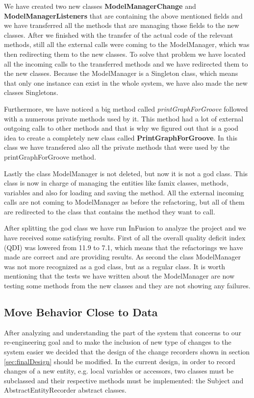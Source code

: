 \documentclass[a4paper]{article}
\begin{document}
We have created two new classes \textbf{ModelManagerChange} and \textbf{ModelManagerListeners} that are containing the above mentioned fields and we have transferred all the methods that are managing those fields to the new classes. After we finished with the transfer of the actual code of the relevant methods, still all the external calls were coming to the ModelManager, which was then redirecting them to the new classes. To solve that problem we have located all the incoming calls to the transferred methods and we have redirected them to the new classes. Because the ModelManager is a Singleton class, which means that only one instance can exist in the whole system, we have also made the new classes Singletons.

Furthermore, we have noticed a big method called \emph{printGraphForGroove} followed with a numerous private methods used by it. This method had a lot of external outgoing calls to other methods and that is why we figured out that is a good idea to create a completely new class called \textbf{PrintGraphForGroove}. In this class we have transfered also all the private methods that were used by the printGraphForGroove method.

Lastly the class ModelManager is not deleted, but now it is not a god class. This class is now in charge of managing the entities like famix classes, methods, variables and also for loading and saving the method. All the external incoming calls are not coming to ModelManager as before the refactoring, but all of them are redirected to the class that contains the method they want to call.

After splitting the god class we have run InFusion to analyze the project and we have received some satisfying results. First of all the overall quality deficit index (QDI) was lowered from 11.9 to 7.1, which means that the refactorings we have made are correct and are providing results. As second the class ModelManager was not more recognized as a god class, but as a regular class. It is worth mentioning that the tests we have written about the ModelManager are now testing some methods from the new classes and they are not showing any failures.

\subsection{Move Behavior Close to Data}
After analyzing and understanding the part of the system that concerns to our re-engineering goal and to make the inclusion of new type of changes to the system easier we decided that the design of the change recorders shown in section \ref{sec:finalDesign} should be modified. In the current design, in order to record changes of a new entity, e.g. local variables or accessors, two classes must be subclassed and their respective methods must be implemented: the Subject and AbstractEntityRecorder abstract classes.
\end{document}
